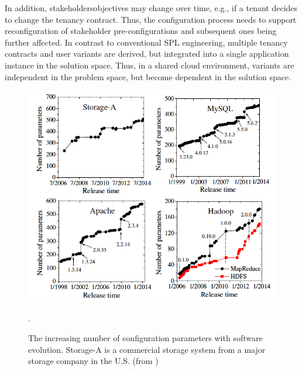 \documentclass{newsig}
\begin{document}
In addition,
stakeholders\textquotesingle   objectives may change over time, e.g., if a tenant
decides to change the tenancy contract. Thus, the configuration process needs to 
support reconfiguration of stakeholder
pre-configurations and subsequent ones being further
affected. In contrast to conventional SPL engineering, multiple
tenancy contracts and user variants are derived, but
integrated into a single application instance in the solution
space. Thus, in a shared cloud environment, variants are independent
in the problem space, but become dependent in
the solution space.


 \begin{figure}[tbh]
\centering
\includegraphics[width=0.9\columnwidth]{Figures/knobs_paper_fig1}
\caption{The increasing number of configuration parameters with
software evolution. Storage-A is a commercial storage system from a
major storage company in the U.S. (from \cite{xu2015hey})}.
\label{fig:knobs_figure}
\end{figure}
\end{document}
